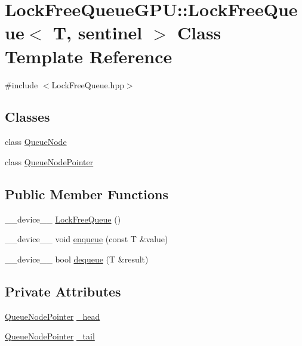 \hypertarget{class_lock_free_queue_g_p_u_1_1_lock_free_queue}{}\section{Lock\+Free\+Queue\+G\+PU\+:\+:Lock\+Free\+Queue$<$ T, sentinel $>$ Class Template Reference}
\label{class_lock_free_queue_g_p_u_1_1_lock_free_queue}


{\ttfamily \#include $<$Lock\+Free\+Queue.\+hpp$>$}

\subsection*{Classes}
\begin{DoxyCompactItemize}
\item 
class \mbox{\hyperlink{class_lock_free_queue_g_p_u_1_1_lock_free_queue_1_1_queue_node}{Queue\+Node}}
\item 
class \mbox{\hyperlink{class_lock_free_queue_g_p_u_1_1_lock_free_queue_1_1_queue_node_pointer}{Queue\+Node\+Pointer}}
\end{DoxyCompactItemize}
\subsection*{Public Member Functions}
\begin{DoxyCompactItemize}
\item 
\+\_\+\+\_\+device\+\_\+\+\_\+ \mbox{\hyperlink{class_lock_free_queue_g_p_u_1_1_lock_free_queue_ae85d149d9b7b114eb5a00e2ec93cd4c4}{Lock\+Free\+Queue}} ()
\item 
\+\_\+\+\_\+device\+\_\+\+\_\+ void \mbox{\hyperlink{class_lock_free_queue_g_p_u_1_1_lock_free_queue_a90dfa85e6684e6f8b446a7a6d61aa1f9}{enqueue}} (const T \&value)
\item 
\+\_\+\+\_\+device\+\_\+\+\_\+ bool \mbox{\hyperlink{class_lock_free_queue_g_p_u_1_1_lock_free_queue_a7d1f7625cfed705520e6a3a6171c6689}{dequeue}} (T \&result)
\end{DoxyCompactItemize}
\subsection*{Private Attributes}
\begin{DoxyCompactItemize}
\item 
\mbox{\hyperlink{class_lock_free_queue_g_p_u_1_1_lock_free_queue_1_1_queue_node_pointer}{Queue\+Node\+Pointer}} \mbox{\hyperlink{class_lock_free_queue_g_p_u_1_1_lock_free_queue_ad41f0126dfecb8bc1c0ef2f17aff1ca1}{\+\_\+head}}
\item 
\mbox{\hyperlink{class_lock_free_queue_g_p_u_1_1_lock_free_queue_1_1_queue_node_pointer}{Queue\+Node\+Pointer}} \mbox{\hyperlink{class_lock_free_queue_g_p_u_1_1_lock_free_queue_a0b018993ccd81f47c7c86e1fce76aab1}{\+\_\+tail}}
\end{DoxyCompactItemize}


